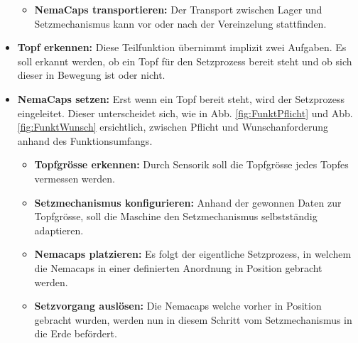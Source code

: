 \begin{itemize}
\begin{itemize}
		\item \textbf{NemaCaps transportieren:} Der Transport zwischen Lager und Setzmechanismus kann vor oder nach der Vereinzelung stattfinden.
	\end{itemize}




	\item \textbf{Topf erkennen:} Diese Teilfunktion übernimmt implizit zwei Aufgaben. Es soll erkannt werden, ob ein Topf für den Setzprozess bereit steht und ob sich dieser in Bewegung ist oder nicht. 
	
	\item \textbf{NemaCaps setzen:} Erst wenn ein Topf bereit steht, wird der Setzprozess eingeleitet. Dieser unterscheidet sich, wie in Abb. \ref{fig:FunktPflicht} und Abb. \ref{fig:FunktWunsch} ersichtlich, zwischen Pflicht und Wunschanforderung anhand des Funktionsumfangs.
	
	\begin{itemize}
		\item \textbf{Topfgrösse erkennen:} Durch Sensorik soll die Topfgrösse jedes Topfes vermessen werden.
		
		\item \textbf{Setzmechanismus konfigurieren:} Anhand der gewonnen Daten zur Topfgrösse, soll die Maschine den Setzmechanismus selbstständig adaptieren.
		
		\item \textbf{Nemacaps platzieren:} Es folgt der eigentliche Setzprozess, in welchem die Nemacaps in einer definierten Anordnung in Position gebracht werden.
		
		\item \textbf{Setzvorgang auslösen:} Die Nemacaps welche vorher in Position gebracht wurden, werden nun in diesem Schritt vom Setzmechanismus in die Erde befördert.
	\end{itemize}
	
\end{itemize}
